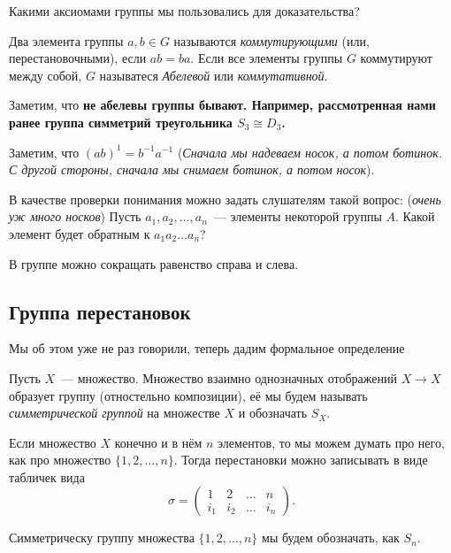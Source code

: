 	\begin{remark}
		Какими аксиомами группы мы пользовались для доказательства? 
	\end{remark}

	\begin{definition} 
		Два элемента группы $a, b \in G$ называются \emph{коммутирующими} (или, перестановочными), если $ab = ba$. Если все элементы группы $G$ коммутируют между собой, $G$ называтеся \emph{Абелевой} или \emph{коммутативной}. 
	\end{definition}

	\begin{remark}
		Заметим, что \bf{не абелевы} группы бывают. Например, рассмотренная нами ранее группа симметрий треугольника $S_{3} \cong D_{3}$.
	\end{remark}

	\begin{example}
		Заметим, что $(ab)^{1} = b^{-1}a^{-1}$ (\emph{Сначала мы надеваем носок, а потом ботинок. С другой  стороны, сначала мы снимаем ботинок, а потом носок}).

		В качестве проверки понимания можно задать слушателям такой вопрос:  (\emph{очень уж много носков}) Пусть $a_1, a_2, \ldots, a_n$~--- элементы некоторой группы $A$. Какой элемент будет обратным к $a_1 a_2 \ldots a_n$?
	\end{example}

	\begin{observation}
		В группе можно сокращать равенство справа и слева. 
	\end{observation}


	\subsection{Группа перестановок}

	Мы об этом уже не раз говорили, теперь дадим формальное определение

	\begin{definition} 
		Пусть $X$~--- множество. Множество взаимно однозначных отображений $X \to X$ образует группу (отностельно композиции), её мы будем называть \emph{симметрической группой} на множестве $X$ и обозначать $S_{X}$. 
	\end{definition}

	\begin{remark}
		Если множество $X$ конечно и в нём $n$ элементов, то мы можем думать про него, как про множество $\{ 1, 2, \ldots, n \}$.  Тогда перестановки можно записывать в виде табличек вида 
		\[
			\sigma = \begin{pmatrix} 1 & 2 & \ldots & n \\ i_{1} & i_{2} & \ldots & i_{n} \end{pmatrix}.
		\]

		Симметрическу группу множества $\{ 1, 2, \ldots, n \}$ мы будем обозначать, как $S_{n}$.
	\end{remark}

